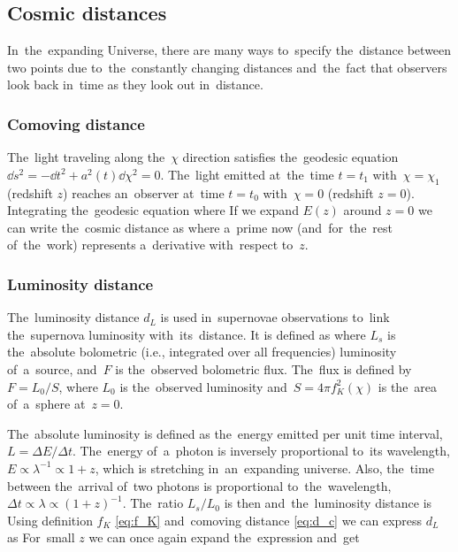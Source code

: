 \subsection{Cosmic distances}
In~the~expanding Universe, there are many ways to~specify the~distance between two points due to~the~constantly changing distances and~the~fact that observers look back in~time as they look out in~distance.
\subsubsection{Comoving distance}
The~light traveling along the~$\chi$ direction satisfies the~geodesic equation $\dd s^2=-\dd t^2+a^2(t)\dd \chi^2=0$. The~light emitted at~the~time $t=t_1$ with~$\chi=\chi_1$ (redshift $z$) reaches an~observer at~time $t=t_0$ with~$\chi=0$ (redshift $z=0$). Integrating the~geodesic equation
where
If we expand $E(z)$ around $z=0$ we can write the~cosmic distance as
where a~prime now (and~for~the~rest of~the~work) represents a~derivative with~respect to~$z$.
\subsubsection{Luminosity distance}
The~luminosity distance $d_L$ is used in~supernovae observations to~link the~supernova luminosity with~its~distance. It is defined as \parencite{weinberg_observational_2013}
where $L_s$ is the~absolute bolometric (i.e., integrated over all frequencies) luminosity of~a~source, and~$F$ is the~observed bolometric flux. The~flux is defined by $F=L_0/S$, where $L_0$ is the~observed luminosity and~$S=4\pi f_K^2(\chi)$ is the~area of~a~sphere at~$z=0$.

The~absolute luminosity is defined as the~energy emitted per unit time interval, $L=\Delta E/\Delta t$. The~energy of~a~photon is inversely proportional to~its wavelength, $E\propto\lambda^{-1}\propto 1+z$, which is stretching in~an~expanding universe. Also, the~time between the~arrival of~two photons is proportional to~the~wavelength, $\Delta t\propto\lambda\propto(1+z)^{-1}$. The~ratio $L_s/L_0$ is then
and~the~luminosity distance is
Using definition \(f_K\) \eqref{eq:f_K} and~comoving distance \eqref{eq:d_c} we can express $d_L$ as
For~small $z$ we can once again expand the~expression and~get
